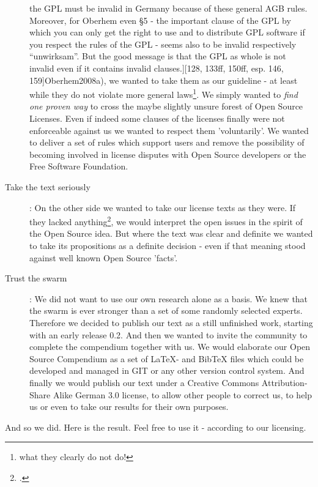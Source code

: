 \begin{description}
  the GPL must be invalid in Germany because of these general AGB rules.
  Moreover, for Oberhem even §5 - the important clause of the GPL by which you
  can only get the right to use and to distribute GPL software if you respect
  the rules of the GPL - seems also to be invalid respectively
  \enquote{unwirksam}. But the good message is that the GPL as whole is not
  invalid even if it contains invalid clauses.][128, 133ff, 150ff, esp. 146,
  159]{Oberhem2008a}), we wanted to take them as our guideline - at least while
  they do not violate more general laws\footnote{what they clearly do not do!}.
  We simply wanted to \emph{find one proven way} to cross the maybe slightly
  unsure forest of Open Source Licenses. Even if indeed some clauses of the
  licenses finally were not enforceable against us we wanted to respect them
  'voluntarily'. We wanted to deliver a set of rules which support users and
  remove the possibility of becoming involved in license disputes with Open
  Source developers or the Free Software Foundation.
  \item[Take the text seriously]: On the other side we wanted to take our
  license texts as they were. If they lacked anything\footcite[The systematical
  underdetermination of licenses is a problem being also known in the Open
  Source respectively Free Software movement. Following the biography of RMS his
  main judicial councelor Moglen has stated, that \enquote{there is uncertainty in
  every legal process (\ldots) } and that it seemed to be silly to try
  \enquote{(\ldots) to take out all the bugs (\ldots)}. Nevertheless - so
  Moglen resp. Williams - the goal of Richard Stallman was \enquote{the complete
  opposite}: He tried \enquote{(\ldots) to remove uncertainty which is
  inherently impossible}. But - and that's the nub of this analysis -
  Moglen had to follow Stallmann because of RMS character. And he had to
  summarize their work so, that \enquote{(\ldots) the resulting elegance (of the
  GPL; KR.), the resulting simplicity (of the GPL; KR.) in design almost
  achieves what it has to achieve}. Hence we are asked to take the license
  texts themselves seriously. cf.][177f]{Williams2002a}, we would interpret the
  open issues in the spirit of the Open Source idea. But where the text was
  clear and definite we wanted to take its propositions as a definite decision -
  even if that meaning stood against well known Open Source 'facts'.
  \item[Trust the swarm]: We did not want to use our own research alone as a
  basis. We knew that the swarm is ever stronger than a set of some randomly
  selected experts. Therefore we decided to publish our text as a still
  unfinished work, starting with an early release 0.2. And then we wanted
  to invite the community to complete the compendium together with us. We would elaborate our Open
  Source Compendium as a set of LaTeX- and BibTeX files which could be developed
  and managed in GIT or any other version control system. And finally we would
  publish our text under a Creative Commons Attribution-Share Alike German 3.0
  license, to allow other people to correct
  us, to help us or even to take our results for their own purposes.
\end{description}

And so we did. Here is the result. Feel free to use it - according to our
licensing.

%
